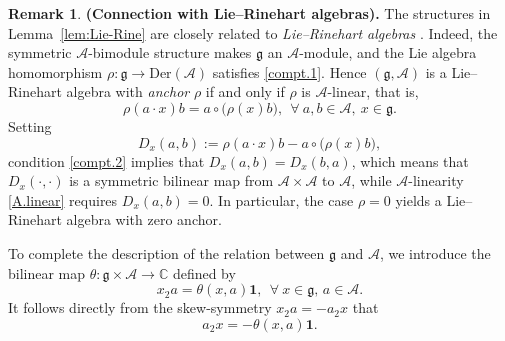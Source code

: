 \documentclass[12pt]{article}
\numberwithin{equation}{section}
\theoremstyle{definition}
\newtheorem{remark}[theorem]{Remark}
\theoremstyle{plain}
\newcommand{\bC}{\ensuremath{\mathbb{C}}}
\newcommand{\fg}{\mathfrak{g}}
\newcommand{\Der}{\mathrm{Der }}
\newcommand{\cA}{\ensuremath{\mathcal{A}}}
\newcommand{\bone}{\mathbf{1 }}
\begin{document}
\begin{remark}\label{rmk:Lie-Rine}\textbf{(Connection with Lie--Rinehart algebras).}
The structures in Lemma~\ref{lem:Lie-Rine} are closely related to \emph{Lie--Rinehart algebras} \cite{Hue,Rine}. Indeed, the symmetric $\mathcal A$-bimodule structure makes $\fg$ an $\cA$-module, and the Lie algebra homomorphism $\rho:\fg\rightarrow\Der(\cA)$ satisfies \eqref{compt.1}. Hence $(\fg,\cA)$ is a Lie--Rinehart algebra with \emph{anchor} $\rho$ if and only if $\rho$ is $\cA$-linear, that is,
\begin{equation}\label{A.linear}
    \rho(a\cdot x)b=a\circ\big(\rho(x)b\big),\ \ \forall\ a,b\in\mathcal A,\ x\in\mathfrak g.
\end{equation}
Setting
\begin{equation*}
    D_x(a,b):=\rho(a\cdot x)b-a\circ\big(\rho(x)b\big),
\end{equation*}
condition \eqref{compt.2} implies that $D_x(a,b)=D_x(b,a)$, which means that $D_x(\cdot,\cdot)$ is a symmetric bilinear map from $\cA\times \cA$ to $\cA$, while $\mathcal A$-linearity \eqref{A.linear} requires $D_x(a,b)=0$. In particular, the case $\rho=0$ yields a
Lie--Rinehart algebra with zero anchor.
\end{remark}


To complete the description of the relation between $\fg$ and $\cA$, we introduce the bilinear map $\theta:\fg\times \cA\rightarrow\bC$ defined by
\begin{equation*}
    x_2a=\theta(x,a)\bone,\ \ \forall\ x\in\fg,\, a\in \cA.
\end{equation*}
It follows directly from the skew-symmetry $x_2a=-a_2x$ that
\begin{equation}\label{a_2x}
    a_2x=-\theta(x,a)\bone.
\end{equation}
\end{document}
